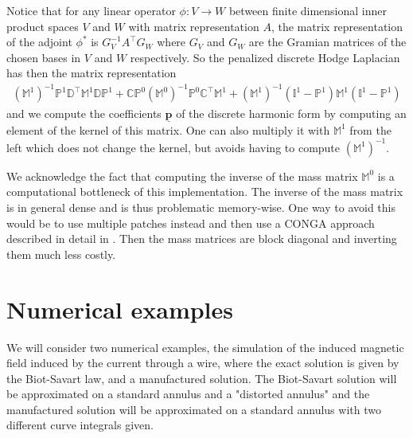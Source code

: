 \documentclass[../master_thesis.tex]{subfiles}
\begin{document}
Notice that for any linear operator $\phi:V \rightarrow W$ between finite dimensional inner product spaces 
$V$ and $W$ with matrix representation $A$, the matrix representation of the
adjoint $\phi^*$ is $G_V^{-1} A^\top G_W$ where 
$G_V$ and $G_W$ are the Gramian matrices of the chosen bases in $V$ and $W$ 
respectively. So the penalized discrete Hodge Laplacian has then the matrix 
representation \begin{align*}
    (\mathbb{M}^1)^{-1} \mathbb{P}^1\mathbb{D}^\top \mathbb{M}^1 \mathbb{D}\mathbb{P}^1 
    + \mathbb{C} \mathbb{P}^0 (\mathbb{M}^0)^{-1} \mathbb{P}^0 \mathbb{C}^\top \mathbb{M}^1
    + (\mathbb{M}^1)^{-1} (\mathbb{I}^1-\mathbb{P}^1) \mathbb{M}^1 (\mathbb{I}^1 - \mathbb{P}^1)
\end{align*} and we compute the 
coefficients $\underline{\mathbf{p}}$ of the discrete harmonic form
by computing an element of the kernel of this matrix. One can also multiply it with 
$\mathbb{M}^1$ from the left which does not change the kernel, but avoids having to 
compute $(\mathbb{M}^1)^{-1}$. 
\begin{remark}
    We acknowledge the fact that computing the inverse of the mass matrix $\mathbb{M}^0$
    is a computational bottleneck of this implementation. The inverse of the mass matrix 
    is in general dense and is thus
    problematic memory-wise. 
    One way to avoid this would be to use multiple patches instead and then use a 
    CONGA approach described in detail in \cite{multipatch_paper}. Then the mass matrices 
    are block diagonal and inverting them much less costly.
\end{remark}


\section{Numerical examples}\label{sec:numerical_examples}
We will consider two numerical examples, the simulation of the induced magnetic 
field induced by the current through a wire, where the exact solution is given by the Biot-Savart law, and 
a manufactured solution. The Biot-Savart solution will be approximated on a standard annulus 
and a "distorted annulus" and the manufactured solution will be approximated 
on a standard annulus with two different curve integrals given.
\end{document}
